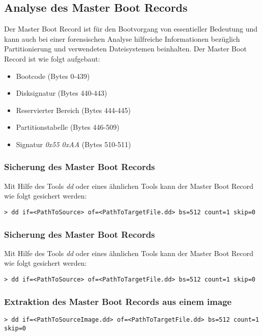 \subsection{Analyse des Master Boot Records}
Der Master Boot Record ist für den Bootvorgang von essentieller Bedeutung und kann auch bei einer forensischen Analyse hilfreiche Informationen bezüglich Partitionierung und verwendeten Dateisystemen beinhalten. Der Master Boot Record ist wie folgt aufgebaut:

\begin{itemize}
\item Bootcode (Bytes 0-439)
\item Disksignatur (Bytes 440-443)
\item Reservierter Bereich (Bytes 444-445)
\item Partitionstabelle (Bytes 446-509)
\item Signatur \textit{0x55 0xAA} (Bytes 510-511)
\end{itemize}

\subsubsection{Sicherung des Master Boot Records}
Mit Hilfe des Tools \textit{dd} oder eines ähnlichen Tools kann der Master Boot Record wie folgt gesichert werden:

\begin{lstlisting}
> dd if=<PathToSource> of=<PathToTargetFile.dd> bs=512 count=1 skip=0
\end{lstlisting}


\subsubsection{Sicherung des Master Boot Records}
Mit Hilfe des Tools \textit{dd} oder eines ähnlichen Tools kann der Master Boot Record wie folgt gesichert werden:

\begin{lstlisting}
> dd if=<PathToSource> of=<PathToTargetFile.dd> bs=512 count=1 skip=0
\end{lstlisting}


\subsubsection{Extraktion des Master Boot Records aus einem image}
\begin{lstlisting}
> dd if=<PathToSourceImage.dd> of=<PathToTargetFile.dd> bs=512 count=1 skip=0
\end{lstlisting}


